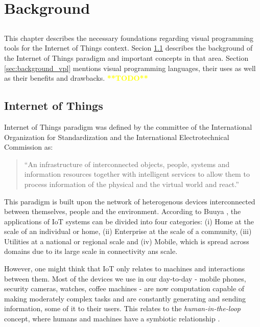 \chapter{Background} \label{chap:background}

\section*{}


This chapter describes the necessary foundations regarding visual programming tools for the Internet of Things context. Secion \ref{sec:background_iot} describes the background of the Internet of Things paradigm and important concepts in that area. Section \ref{sec:background_vpl} mentions visual programming languages, their uses as well as their benefits and drawbacks.  \textcolor{yellow}{\textbf{**TODO**}}

\section{Internet of Things}\label{sec:background_iot}

Internet of Things paradigm was defined by the committee of the International Organization for Standardization and the International Electrotechnical Commission \cite{ISOIEC} as:
\begin{quote}
    “An infrastructure of interconnected objects, people, systems and information resources together with intelligent services to allow them to process information of the physical and the virtual world and react.”
\end{quote}
\par This paradigm is built upon the network of heterogenous devices interconnected between themselves, people and the environment. According to Buuya \cite{iot_future_direction}, the applications of IoT systems can be divided into four categories: (i) Home at the scale of an individual or home, (ii) Enterprise at the scale of a community, (iii) Utilities at a national or regional scale and (iv) Mobile, which is spread across domains due to its large scale in connectivity ans scale. 
\par However, one might think that IoT only relates to machines and interactions between them. Most of the devices we use in our day-to-day - mobile phones, security cameras, watches, coffee machines - are now computation capable of making moderately complex tasks and are constantly generating and sending information, some of it to their users. This relates to the \emph{human-in-the-loop} concept, where humans and machines have a symbiotic relationship \cite{human_in_the_loop_survey}.
 
